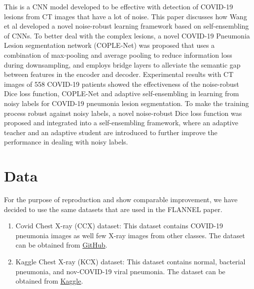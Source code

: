 \documentclass{sigkddExp}
\begin{document}
This is a CNN model \cite{wang2020covidnet} developed to be effective with
detection of COVID-19 lesions from CT images that have a lot of noise. This
paper discusses how Wang et al developed a novel noise-robust learning framework
based on self-ensembling of CNNs.  To better deal with the complex lesions, a
novel COVID-19 Pneumonia Lesion segmentation network (COPLE-Net) was proposed
that uses a combination of max-pooling and average pooling to reduce information
loss during downsampling, and employs bridge layers to alleviate the semantic
gap between features in the encoder and decoder. Experimental results with CT
images of 558 COVID-19 patients showed the effectiveness of the noise-robust
Dice loss function, COPLE-Net and adaptive self-ensembling in learning from
noisy labels for COVID-19 pneumonia lesion segmentation. To make the training
process robust against noisy labels, a novel noise-robust Dice loss function was
proposed and integrated into a self-ensembling framework, where an adaptive
teacher and an adaptive student are introduced to further improve the
performance in dealing with noisy labels.

%

\section{Data}

For the purpose of reproduction and show comparable improvement, we have decided
to use the same datasets that are used in the FLANNEL paper.

\begin{enumerate}
    \item Covid Chest X-ray (CCX) dataset: This dataset contains COVID-19
    pneumonia images as well few X-ray images from other classes. The dataset
    can be obtained from \href{https://github.com/ieee8023/covid-chestxray-dataset}{GitHub}.
    
    
    \item Kaggle Chest X-ray (KCX) dataset: This dataset contains normal,
    bacterial pneumonia, and nov-COVID-19 viral pneumonia. The dataset can be
    obtained from
    \href{https://www.kaggle.com/paultimothymooney/chest-xray-pneumonia}{Kaggle}.
    
\end{enumerate}
\end{document}

